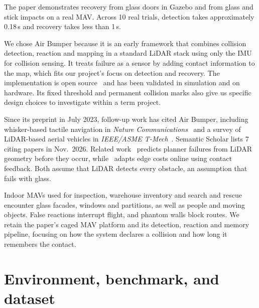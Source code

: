 \documentclass[conference,10pt]{IEEEtran}
\begin{document}
The paper demonstrates recovery from glass doors in Gazebo and from glass and stick impacts on a real MAV. Across 10 real trials, detection takes approximately 0.18\,s and recovery takes less than 1\,s.

We chose Air Bumper because it is an early framework that combines collision detection, reaction and mapping in a standard LiDAR stack using only the IMU for collision sensing. It treats failure as a sensor by adding contact information to the map, which fits our project's focus on detection and recovery. The implementation is open source~\cite{airbumpercode} and has been validated in simulation and on hardware. Its fixed threshold and permanent collision marks also give us specific design choices to investigate within a term project.

Since its preprint in July 2023, follow-up work has cited Air Bumper, including whisker-based tactile navigation in \emph{Nature Communications}~\cite{whisker} and a survey of LiDAR-based aerial vehicles in \emph{IEEE/ASME T-Mech}~\cite{lidarsurvey}. Semantic Scholar lists 7 citing papers in Nov.~2026. Related work~\cite{gp} predicts planner failures from LiDAR geometry before they occur, while~\cite{ifar} adapts edge costs online using contact feedback. Both assume that LiDAR detects every obstacle, an assumption that fails with glass.

Indoor MAVs used for inspection, warehouse inventory and search and rescue encounter glass facades, windows and partitions, as well as people and moving objects. False reactions interrupt flight, and phantom walls block routes. We retain the paper's caged MAV platform and its detection, reaction and memory pipeline, focusing on how the system declares a collision and how long it remembers the contact.

\section{Environment, benchmark, and dataset}
\end{document}
